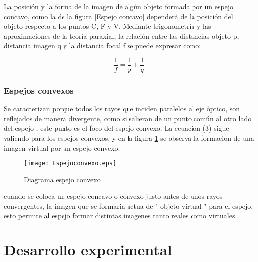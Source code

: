 \documentclass[a4paper,12pt]{article}
\begin{document}
La posición y la forma de la imagen de algún objeto formada por un espejo concavo, como la de la figura \ref{Espejo concavo} dependerá de la posición del objeto respecto a los puntos C, F y V. Mediante trigonometría y las aproximaciones de la teoría paraxial, la relación entre las distancias objeto p, distancia imagen q  y la distancia focal f se puede expresar como:

\begin{equation}
    \frac{1}{f}=\frac{1}{p}+\frac{1}{q}
\end{equation}



\subsubsection*{Espejos convexos}
Se caracterizan porque todos los rayos que inciden paralelos al eje óptico, son reflejados de manera divergente, como si salieran de un punto común al otro lado del espejo , este punto es el foco del espejo convexo. La ecuacion (3) sigue valiendo para los espejos convexos, y en la figura \ref{fig:Espejo convexo} se observa la formacion de una imagen virtual por un espejo convexo. 

\begin{figure}[h]
    \centering  
    \texttt{[image: Espejoconvexo.eps]}
    \caption{Diagrama espejo convexo}
    \label{fig:Espejo convexo}
\end{figure}
 
 cuando se coloca un espejo concavo o convexo justo antes de unos rayos convergentes, la imagen que se formaria actua de " objeto virtual " para el espejo, esto permite al espejo formar distintas imagenes tanto reales como virtuales. 
\section*{Desarrollo experimental}
\end{document}
